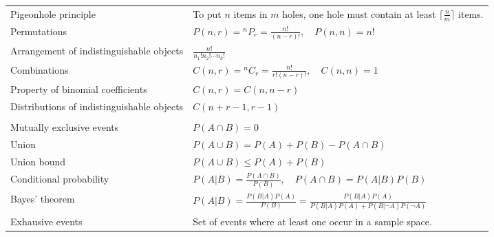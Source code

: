 \documentclass[a4paper,landscape]{article}
\begin{document}
\begin{multicols*}{2}
\begin{tabularx}{\columnwidth}{@{}lX@{}}
        Pigeonhole principle                       & To put $n$ items in $m$ holes, one hole must contain at least $\lceil \frac{n}{m} \rceil$ items.                     \\
        Permutations                               & $P(n,r) = {}^nP_r = \frac{n!}{(n-r)!},\quad P(n,n) = n!$                                                             \\
        Arrangement of indistinguishable objects   & $\frac{n!}{n_1! n_2! \cdots n_k!}$                                                                                   \\
        Combinations                               & $C(n,r) = {}^nC_r = \frac{n!}{r!(n-r)!},\quad C(n,n) = 1$                                                            \\
        Property of binomial coefficients          & $C(n,r) = C(n,n-r)$                                                                                                  \\
        Distributions of indistinguishable objects & $C(n+r-1, r-1)$                                                                                                      \\
        \\
        Mutually exclusive events                  & $P(A \cap B) = 0$                                                                                                    \\
        Union                                      & $P(A \cup B) = P(A) + P(B) - P(A \cap B)$                                                                            \\
        Union bound                                & $P(A \cup B) \leq P(A) + P(B)$                                                                                       \\
        Conditional probability                    & $P(A|B) = \frac{P(A \cap B)}{P(B)},\quad P(A \cap B) = P(A|B)P(B)$                                                   \\
        Bayes' theorem                             & $P(A|B) = \frac{P(B|A)P(A)}{P(B)} = \frac{P(B|A)P(A)}{P(B|A)P(A) + P(B|\neg A)P(\neg A)}$                            \\
        Exhausive events                           & Set of events where at least one occur in a sample space.                                                            \\

\end{tabularx}
\end{multicols*}
\end{document}
